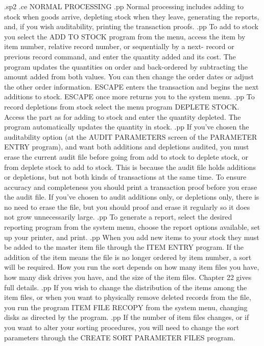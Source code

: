 .sp2
.ce
NORMAL PROCESSING
.pp
Normal processing includes adding to stock when goods arrive, depleting
stock when they leave, generating the reports, and, if you wish auditability,
printing the transaction proofs.
.pp
To add to stock you select the ADD TO STOCK program from the menu, access
the item by item number, relative record number, or sequentially by a next-
record or previous record command, and
enter the quantity added and its cost.	The program updates the quantities
on order and back-ordered by subtracting the amount added from both values.
You can then change the order dates or adjust the other
order information.  ESCAPE enters the transaction and
begins the next additions to stock.  ESCAPE once more
returns you to the system menu.
.pp
To record depletions from stock select the menu program DEPLETE STOCK.	Access
the part as for adding to stock and enter the quantity depleted.  The program
automatically updates the quantity in stock.
.pp
If you've chosen the auditability option (at the AUDIT PARAMETERS screen of
the PARAMETER ENTRY program), and want both additions and depletions
audited, you must erase the current audit file before going from
add to stock to deplete stock, or from deplete stock to add to stock.
This is because the audit file	holds additions or depletions, but not
both kinds of transactions at the same time.
To ensure accuracy and completeness you should print a transaction proof
before you erase the audit file.  If you've chosen to audit additions only,
or depletions only, there is no need to erase the file, but you should
proof and erase it regularly so it does not grow unnecessarily large.
.pp
To generate a report, select the desired reporting program from the system
menu, choose the report options available, set up your printer, and print.
.pp
When you add new items to your stock they must be added to the master item
file through the ITEM ENTRY program.  If the addition of the item means
the file is no longer ordered by item number, a sort will be required.
How you run the sort depends on how many item files you have, how many
disk drives you have, and the size of the item files.  Chapter 22 gives
full details.
.pp
If you wish to change the distribution of the items among the item files,
or when you want to physically remove deleted records from the file, you
run the program ITEM FILE RECOPY from the system menu, changing disks as
directed by the program.
.pp
If the number of item files changes, or if you want to alter your sorting
procedures, you will need to change the sort parameters through the CREATE
SORT PARAMETER FILES program.
